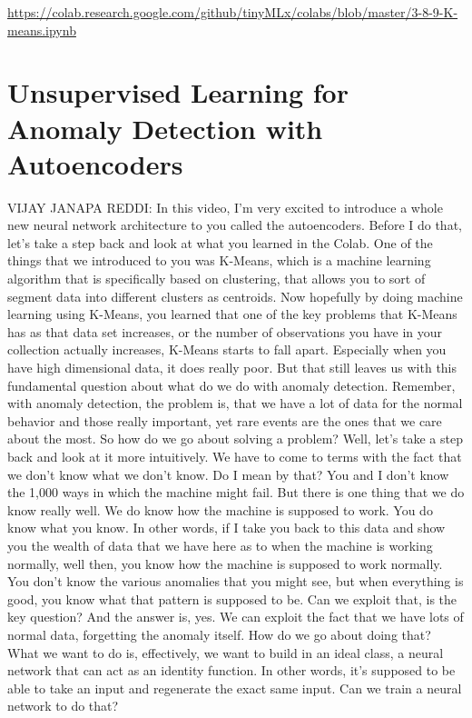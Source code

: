 \url{https://colab.research.google.com/github/tinyMLx/colabs/blob/master/3-8-9-K-means.ipynb}

\section{Unsupervised Learning for Anomaly Detection with Autoencoders}

VIJAY JANAPA REDDI: In this video, I'm very
excited to introduce a whole new neural network architecture to you
called the autoencoders.
Before I do that, let's take a step back and look
at what you learned in the Colab.
One of the things that we introduced to you
was K-Means, which is a machine learning algorithm that is specifically
based on clustering, that allows you to sort of segment data
into different clusters as centroids.
Now hopefully by doing machine learning using K-Means,
you learned that one of the key problems that K-Means has as that data
set increases, or the number of observations
you have in your collection actually increases,
K-Means starts to fall apart.
Especially when you have high dimensional data, it does really poor.
But that still leaves us with this fundamental question about what
do we do with anomaly detection.
Remember, with anomaly detection, the problem
is, that we have a lot of data for the normal behavior
and those really important, yet rare events are the ones
that we care about the most.
So how do we go about solving a problem?
Well, let's take a step back and look at it more intuitively.
We have to come to terms with the fact that we don't know what we don't know.
Do I mean by that?
You and I don't know the 1,000 ways in which the machine might fail.
But there is one thing that we do know really well.
We do know how the machine is supposed to work.
You do know what you know.
In other words, if I take you back to this data
and show you the wealth of data that we have
here as to when the machine is working normally,
well then, you know how the machine is supposed to work normally.
You don't know the various anomalies that you might see,
but when everything is good, you know what that pattern is supposed to be.
Can we exploit that, is the key question?
And the answer is, yes.
We can exploit the fact that we have lots of normal data,
forgetting the anomaly itself.
How do we go about doing that?
What we want to do is, effectively, we want
to build in an ideal class, a neural network that
can act as an identity function.
In other words, it's supposed to be able to take an input
and regenerate the exact same input.
Can we train a neural network to do that?
